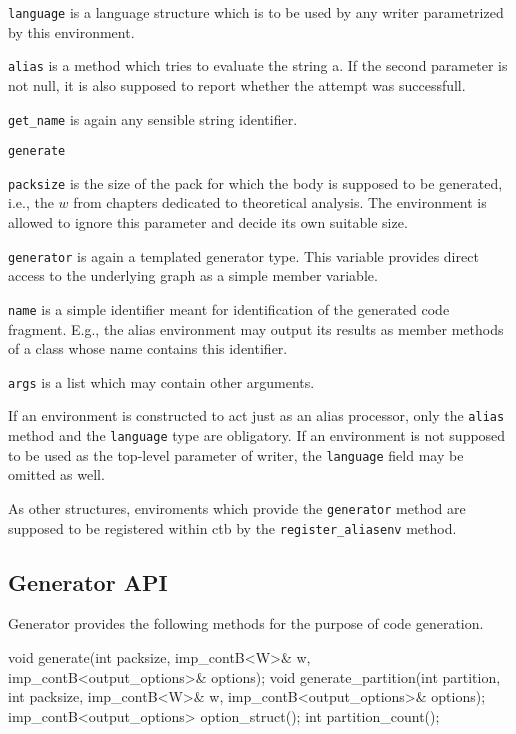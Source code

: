 \begin{description}
\item \texttt{language} is a language structure which is to be used by any writer parametrized by this environment.
\item \texttt{alias} is a method which tries to evaluate the string a. If the second parameter is not null, it is also supposed to report whether the attempt was successfull.
\item \texttt{get\_name} is again any sensible string identifier.
\item \texttt{generate}
  \begin{description}
    \item \texttt{packsize} is the size of the pack for which the body is supposed to be generated, i.e., the $w$ from chapters dedicated to theoretical analysis. The environment is allowed to ignore this parameter and decide its own suitable size.
    \item \texttt{generator} is again a templated generator type. This variable provides direct access to the underlying graph as a simple member variable.
    \item \texttt{name} is a simple identifier meant for identification of the generated code fragment. E.g., the alias environment may output its results as member methods of a class whose name contains this identifier.
    \item \texttt{args} is a list which may contain other arguments.
  \end{description}
\end{description}

If an environment is constructed to act just as an alias processor, only the \texttt{alias} method and the \texttt{language} type are obligatory. If an environment is not supposed to be used as the top-level parameter of writer, the \texttt{language} field may be omitted as well.

As other structures, enviroments which provide the \texttt{generator} method are supposed to be registered within ctb by the \texttt{register\_aliasenv} method.

\subsection{Generator API}

Generator provides the following methods for the purpose of code generation. 

\begin{code}
void generate(int packsize, 
    imp_contB<W>& w, imp_contB<output_options>& options); 
void generate_partition(int partition, int packsize, 
    imp_contB<W>& w, imp_contB<output_options>& options);
imp_contB<output_options> option_struct();
int partition_count();
\end{code}

